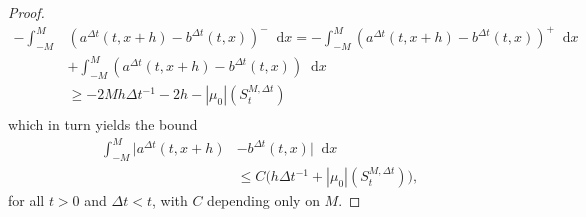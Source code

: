 \documentclass[11pt, twoside, reqno]{amsart}
\theoremstyle{definition}
\theoremstyle{remark}
\numberwithin{equation}{section}
\newcommand*\dif{\mathop{}\!\mathrm{d}}
\begin{document}
\begin{proof}
\begin{equation}
\begin{aligned}
        -\int_{-M}^M & (a^{\Delta t}(t, x+h)-b^{\Delta t}(t, x))^-  \dif x  = -\int_{-M}^M (a^{\Delta t}(t, x+h)- b^{\Delta t}(t, x))^+ \dif x \\
        &+ \int_{-M}^M (a^{\Delta t}(t, x+h)- b^{\Delta t}(t, x)) \dif x\\
        & \geq -2M h\Delta t^{-1} -2h-|\mu_0|(S_t^{M, \Delta t}) \\
    \end{aligned}
\end{equation}
which in turn yields the bound 
\begin{equation}\label{eq:Oleinik}
\begin{aligned}
    \int_{-M}^M |a^{\Delta t}(t, x+h) &-b^{\Delta t}(t, x)|  \dif x \\
    & \leq C \Big( h\Delta t^{-1}+ |\mu_0|(S_t^{M, \Delta t})\Big),
\end{aligned}
\end{equation}
for all $t > 0$ and $\Delta t < t$, with $C$ depending only on $M$. 


\end{proof}
\end{document}
